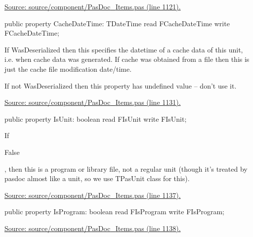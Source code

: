 \documentclass{report}
\newif\ifpdf
\begin{document}
\begin{list}{}
\par  \par
\href{https://github.com/pasdoc/pasdoc/blob/master/source/component/PasDoc_Items.pas#L1121}{Source: source/component/PasDoc{\_}Items.pas (line 1121).}\label{PasDoc_Items.TPasUnit-CacheDateTime}
\item[\textbf{CacheDateTime}\hfill]
\ifpdf
\begin{flushleft}
\fi
\begin{ttfamily}
public property CacheDateTime: TDateTime
      read FCacheDateTime write FCacheDateTime;\end{ttfamily}

\ifpdf
\end{flushleft}
\fi


\par If WasDeserialized then this specifies the datetime of a cache data of this unit, i.e. when cache data was generated. If cache was obtained from a file then this is just the cache file modification date/time.

If not WasDeserialized then this property has undefined value -- don't use it.\par
\href{https://github.com/pasdoc/pasdoc/blob/master/source/component/PasDoc_Items.pas#L1131}{Source: source/component/PasDoc{\_}Items.pas (line 1131).}\label{PasDoc_Items.TPasUnit-IsUnit}
\item[\textbf{IsUnit}\hfill]
\ifpdf
\begin{flushleft}
\fi
\begin{ttfamily}
public property IsUnit: boolean read FIsUnit write FIsUnit;\end{ttfamily}

\ifpdf
\end{flushleft}
\fi


\par If \begin{ttfamily}False\end{ttfamily}, then this is a program or library file, not a regular unit (though it's treated by pasdoc almost like a unit, so we use TPasUnit class for this).\par
\href{https://github.com/pasdoc/pasdoc/blob/master/source/component/PasDoc_Items.pas#L1137}{Source: source/component/PasDoc{\_}Items.pas (line 1137).}\label{PasDoc_Items.TPasUnit-IsProgram}
\item[\textbf{IsProgram}\hfill]
\ifpdf
\begin{flushleft}
\fi
\begin{ttfamily}
public property IsProgram: boolean read FIsProgram write FIsProgram;\end{ttfamily}

\ifpdf
\end{flushleft}
\fi


\par  \par
\href{https://github.com/pasdoc/pasdoc/blob/master/source/component/PasDoc_Items.pas#L1138}{Source: source/component/PasDoc{\_}Items.pas (line 1138).}\end{list}
\end{document}
